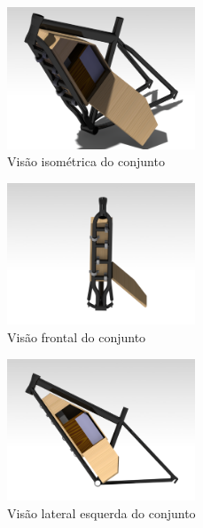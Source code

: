 		\graphicspath{{figuras/}}	
		\begin{figure}[H]
			\centering
			\includegraphics[width=0.5\textwidth]{box_iso2.png}
			\caption{Visão isométrica do conjunto}
			\label{img:box_iso2}
		\end{figure}
		\graphicspath{{figuras/}}	
		\begin{figure}[H]
			\centering
			\includegraphics[width=0.5\textwidth]{box_frontal.png}
			\caption{Visão frontal do conjunto}
			\label{img:box_frontal}
		\end{figure}

			\graphicspath{{figuras/}}	
		\begin{figure}[H]
			\centering
			\includegraphics[width=0.5\textwidth]{box_lesquerda.png}
			\caption{Visão lateral esquerda do conjunto}
			\label{img:box_lesquerda}
		\end{figure}
